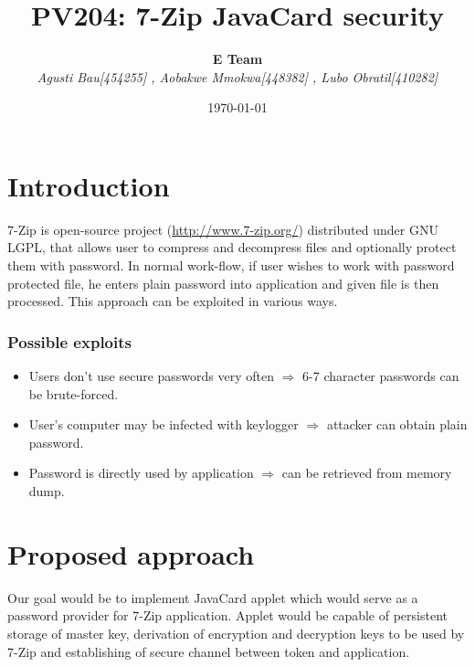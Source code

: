 \documentclass[letterpaper]{article}
\title{PV204: 7-Zip JavaCard security}
\author{\textbf{E Team} \\ \textit{Agusti Bau[454255] , Aobakwe Mmokwa[448382] , Lubo Obratil[410282]}}
\date{\today}
\begin{document}
\maketitle

\section{Introduction}
7-Zip is open-source project (\url{http://www.7-zip.org/}) distributed under GNU LGPL, 
that allows user to compress and decompress files and optionally protect them with password. In
normal work-flow, if user wishes to work with password protected file, he enters plain 
password into application and given file is then processed. This approach can be exploited in
various ways.

\subsubsection*{Possible exploits}
\begin{itemize}
\item Users don't use secure passwords very often $\Rightarrow$ 6-7 character passwords can be brute-forced.
\item User's computer may be infected with keylogger $\Rightarrow$ attacker can obtain plain password.
\item Password is directly used by application $\Rightarrow$ can be retrieved from memory dump.
\end{itemize}

\section{Proposed approach}
Our goal would be to implement JavaCard applet which would serve as a password provider for
7-Zip application. Applet would be capable of persistent storage of master key, derivation of
encryption and decryption keys to be used by 7-Zip and establishing of secure channel between
token and application.
\end{document}
